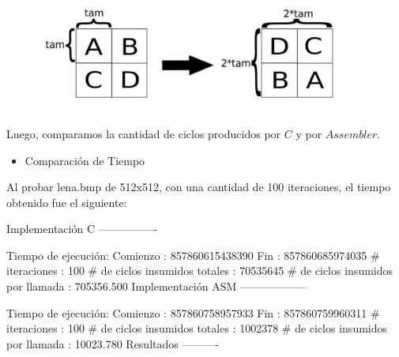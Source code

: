 \documentclass[10pt, a4paper]{article}
\begin{document}
\begin{itemize}
\begin{figure}[H] %
\begin{center}
\includegraphics[width=300pt]{./recortar.jpg}
\end{center}
\end{figure}

Luego, comparamos la cantidad de ciclos producidos por $C$ y por $Assembler$.\newline
\begin{itemize}
\item{Comparación de Tiempo}
\end{itemize}
Al probar lena.bmp de 512x512, con una cantidad de 100 iteraciones, el tiempo obtenido fue el siguiente:\newline

Implementación C\newline
----------------

Tiempo de ejecución:\newline
  Comienzo                          : 857860615438390\newline
  Fin                               : 857860685974035\newline
  \# iteraciones                     : 100\newline
  \# de ciclos insumidos totales     : 70535645\newline
  \# de ciclos insumidos por llamada : 705356.500\newline
\newline
Implementación ASM\newline
------------------

Tiempo de ejecución:\newline
  Comienzo                          : 857860758957933\newline
  Fin                               : 857860759960311\newline
  \# iteraciones                     : 100\newline
  \# de ciclos insumidos totales     : 1002378\newline
  \# de ciclos insumidos por llamada : 10023.780\newline
\newline
Resultados\newline
----------


\end{itemize}
\end{document}
